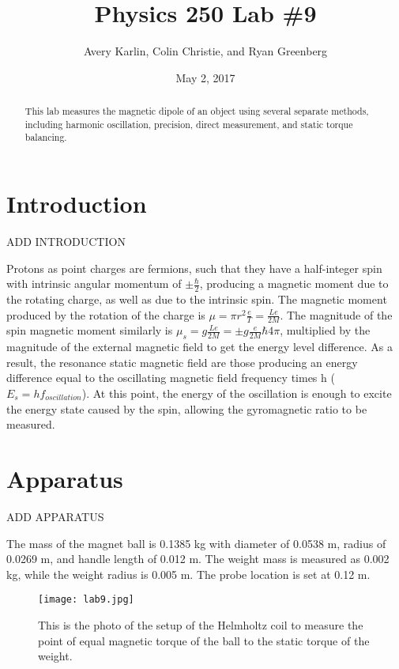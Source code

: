 \documentclass[11pt]{article}
\title{Physics 250 Lab \#9}
\author{Avery Karlin, Colin Christie, and Ryan Greenberg}
\date{May 2, 2017}
\begin{document}
\maketitle
\begin{abstract} This lab measures the magnetic dipole of an object using several separate methods, including harmonic oscillation, precision, direct measurement, and static torque balancing.
\end{abstract}

\section{Introduction}

ADD INTRODUCTION

Protons as point charges are fermions, such that they have a half-integer spin with intrinsic angular momentum of $\pm \frac{\hbar}{2}$, producing a magnetic moment due to the rotating charge, as well as due to the intrinsic spin. The magnetic moment produced by the rotation of the charge is $\mu = \pi r^2 \frac{e}{T} = \frac{Le}{2M}$. The magnitude of the spin magnetic moment similarly is $\mu_s = g\frac{Le}{2M} = \pm g \frac{e}{2M}{\hbar}{4\pi}$, multiplied by the magnitude of the external magnetic field to get the energy level difference. As a result, the resonance static magnetic field are those producing an energy difference equal to the oscillating magnetic field frequency times h ($E_s = hf_{oscillation}$). At this point, the energy of the oscillation is enough to excite the energy state caused by the spin, allowing the gyromagnetic ratio to be measured.

\section{Apparatus}

ADD APPARATUS

The mass of the magnet ball is 0.1385 kg with diameter of 0.0538 m, radius of 0.0269 m, and handle length of 0.012 m. The weight mass is measured as 0.002 kg, while the weight radius is 0.005 m. The probe location is set at 0.12 m.

\begin{figure}[h]
\begin{center}
\texttt{[image: lab9.jpg]}
\caption{This is the photo of the setup of the Helmholtz coil to measure the point of equal magnetic torque of the ball to the static torque of the weight.}
\label{equip}
\end{center}
\end{figure}
\end{document}
